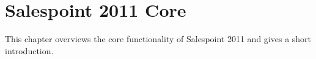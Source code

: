 \chapter{Salespoint 2011 Core}
This chapter overviews the core functionality of Salespoint 2011 and gives a short introduction.











